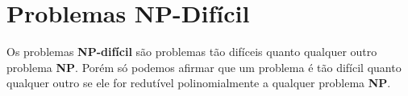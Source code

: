 \section{Problemas NP-Difícil}
Os problemas \textbf{NP-difícil} são problemas tão difíceis quanto qualquer outro problema \textbf{NP}. Porém só podemos afirmar que um problema é tão difícil quanto qualquer outro se ele for redutível polinomialmente a qualquer problema \textbf{NP}.
